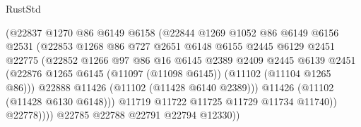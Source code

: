 \begin{lexlean}{RustStd}
\begin{coremodule}
                                  (@22837
                                    @1270
                                    @86
                                    @6149
                                    @6158
                                    (@22844
                                      @1269
                                      @1052
                                      @86
                                      @6149
                                      @6156
                                      @2531
                                      (@22853
                                        @1268
                                        @86
                                        @727
                                        @2651
                                        @6148
                                        @6155
                                        @2445
                                        @6129
                                        @2451
                                        @22775
                                        (@22852
                                          @1266
                                          @97
                                          @86
                                          @16
                                          @6145
                                          @2389
                                          @2409
                                          @2445
                                          @6139
                                          @2451
                                          (@22876
                                            @1265
                                            @6145
                                            (@11097 (@11098 @6145))
                                            (@11102 (@11104 @1265 @86)))
                                          @22888
                                          @11426
                                          (@11102 (@11428 @6140 @2389)))
                                        @11426
                                        (@11102 (@11428 @6130 @6148)))
                                      @11719
                                      @11722
                                      @11725
                                      @11729
                                      @11734
                                      @11740))
                                  @22778))))
                          @22785
                          @22788
                          @22791
                          @22794
                          @12330))

\end{coremodule}
\end{lexlean}
